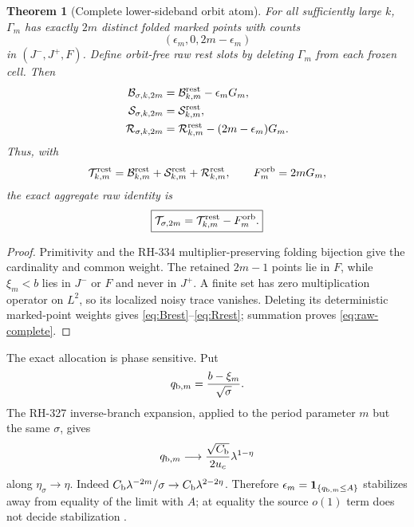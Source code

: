 \documentclass[11pt]{article}
\newtheorem{theorem}{Theorem}[section]
\theoremstyle{remark}
\newcommand{\cB}{\mathcal B}
\newcommand{\cS}{\mathcal S}
\newcommand{\cR}{\mathcal R}
\newcommand{\cT}{\mathcal T}
\newcommand{\one}{\mathbf 1}
\begin{document}
\begin{theorem}[Complete lower-sideband orbit atom]
\label{thm:complete}
For all sufficiently large $k$, $\Gamma_m$ has exactly $2m$ distinct folded
marked points with counts
\begin{equation}\label{eq:counts}
 (\epsilon_m,0,2m-\epsilon_m)
\end{equation}
in $(J^-,J^+,F)$.  Define orbit-free raw rest slots by deleting $\Gamma_m$
from each frozen cell.  Then
\begin{align}
 \cB_{\sigma,k,2m}&=\cB_{k,m}^{\rm rest}-\epsilon_mG_m,
 \label{eq:Brest}\\
 \cS_{\sigma,k,2m}&=\cS_{k,m}^{\rm rest},
 \label{eq:Srest}\\
 \cR_{\sigma,k,2m}&=\cR_{k,m}^{\rm rest}-(2m-\epsilon_m)G_m.
 \label{eq:Rrest}
\end{align}
Thus, with
\begin{equation}\label{eq:Trest}
 \cT_{k,m}^{\rm rest}=\cB_{k,m}^{\rm rest}
 +\cS_{k,m}^{\rm rest}+\cR_{k,m}^{\rm rest},
 \qquad F_m^{\rm orb}=2mG_m,
\end{equation}
the exact aggregate raw identity is
\begin{equation}\label{eq:raw-complete}
 \boxed{\cT_{\sigma,2m}=\cT_{k,m}^{\rm rest}-F_m^{\rm orb}.}
\end{equation}
\end{theorem}

\begin{proof}
Primitivity and the RH-334 multiplier-preserving folding bijection give the
cardinality and common weight.  The retained $2m-1$ points lie in $F$, while
$\xi_m<b$ lies in $J^-$ or $F$ and never in $J^+$.  A finite set has zero
multiplication operator on $L^2$, so its localized noisy trace vanishes.
Deleting its deterministic marked-point weights gives
\eqref{eq:Brest}--\eqref{eq:Rrest}; summation proves
\eqref{eq:raw-complete}.
\end{proof}

The exact allocation is phase sensitive.  Put
\begin{equation}\label{eq:qbm}
 q_{{\rm b},m}=\frac{b-\xi_m}{\sqrt\sigma}.
\end{equation}
The RH-327 inverse-branch expansion, applied to the period parameter $m$ but
the same $\sigma$, gives
\begin{equation}\label{eq:qbm-limit}
 q_{{\rm b},m}\longrightarrow
 \frac{\sqrt{C_{\rm b}}}{2u_c}\lambda^{1-\eta}
\end{equation}
along $\eta_\sigma\to\eta$.  Indeed
$C_{\rm b}\lambda^{-2m}/\sigma
\to C_{\rm b}\lambda^{2-2\eta}$.
Therefore $\epsilon_m=\one_{\{q_{{\rm b},m}\le A\}}$ stabilizes away from
equality of the limit with $A$; at equality the source $o(1)$ term does not
decide stabilization \citep{WangNeighboringBudget2026}.
\end{document}
